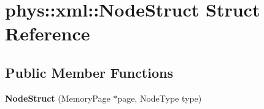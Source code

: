 \hypertarget{structphys_1_1xml_1_1NodeStruct}{
\section{phys::xml::NodeStruct Struct Reference}
\label{d7/dd5/structphys_1_1xml_1_1NodeStruct}
}
\subsection*{Public Member Functions}
\begin{DoxyCompactItemize}
\item 
\hypertarget{structphys_1_1xml_1_1NodeStruct_ab7db6e817c43962b6e67e7faa70a2862}{
{\bfseries NodeStruct} (MemoryPage $\ast$page, NodeType type)}
\label{d7/dd5/structphys_1_1xml_1_1NodeStruct_ab7db6e817c43962b6e67e7faa70a2862}

\end{DoxyCompactItemize}

